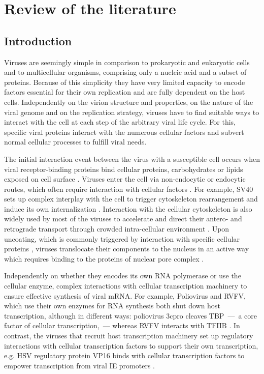 \newpage
\setcounter{page}{1}
\onehalfspacing
\section{Review of the literature}

\subsection{Introduction}
	
	Viruses are seemingly simple in comparison to prokaryotic and eukaryotic cells and to multicellular organisms, comprising only a nucleic acid and a subset of proteins. Because of this simplicity they have very limited capacity to encode factors essential for their own replication and are fully dependent on the host cells. Independently on the virion structure and properties, on the nature of the viral genome and on the replication strategy, viruses have to find suitable ways to interact with the cell at each step of the arbitrary viral life cycle. For this, specific viral proteins interact with the numerous cellular factors and subvert normal cellular processes to fulfill viral needs.
			
	The initial interaction event between the virus with a susceptible cell occurs when viral receptor-binding proteins bind cellular proteins, carbohydrates or lipids exposed on cell surface \parencite{Poranen2002}. Viruses enter the cell via non-endocytic or endocytic routes, which often require interaction with cellular factors \parencite{Dimitrov2004}. For example, \gls{SV40} sets up complex interplay with the cell to trigger cytoskeleton rearrangement and induce its own internalization \parencite{Pelkmans2002}. Interaction with the cellular cytoskeleton is also widely used by most of the viruses to accelerate and direct their antero- and retrograde transport through crowded intra-cellular environment \parencite{Ploubidou2001}. Upon uncoating, which is commonly triggered by interaction with specific cellular proteins \parencite{Suomalainen2013, Haywood2010}, viruses translocate their components to the nucleus in an active way which requires binding to the proteins of nuclear pore complex \parencite{Kobiler2012}.
				
	Independently on whether they encodes its own RNA polymerase or use the cellular enzyme, complex interactions with cellular transcription machinery to ensure effective synthesis of viral mRNA. For example, Poliovirus and \gls{RVFV}, which use their own enzymes for RNA synthesis both shut down host transcription, although in different ways: poliovirus \gls{3cpro} cleaves \gls{TBP}~---~a core factor of cellular transcription,~--- whereas \gls{RVFV} interacts with \gls{TFIIB} \parencite{Kundu2005, LeMay2004}. In contrast, the viruses that recruit host transcription machinery set up regulatory interactions with cellular transcription factors to support their own transcription, e.g. \gls{HSV} regulatory protein VP16 binds with cellular transcription factors to empower transcription from viral \gls{IE} promoters \parencite{Wysocka2003}.

